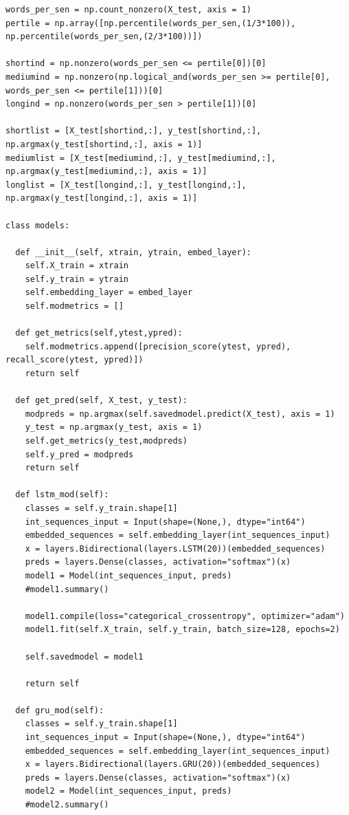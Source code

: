 \documentclass[12pt]{article}
\begin{document}
\begin{lstlisting}[breaklines]
words_per_sen = np.count_nonzero(X_test, axis = 1)
pertile = np.array([np.percentile(words_per_sen,(1/3*100)), np.percentile(words_per_sen,(2/3*100))])

shortind = np.nonzero(words_per_sen <= pertile[0])[0]
mediumind = np.nonzero(np.logical_and(words_per_sen >= pertile[0], words_per_sen <= pertile[1]))[0]
longind = np.nonzero(words_per_sen > pertile[1])[0]

shortlist = [X_test[shortind,:], y_test[shortind,:], np.argmax(y_test[shortind,:], axis = 1)]
mediumlist = [X_test[mediumind,:], y_test[mediumind,:], np.argmax(y_test[mediumind,:], axis = 1)]
longlist = [X_test[longind,:], y_test[longind,:], np.argmax(y_test[longind,:], axis = 1)]

class models:

  def __init__(self, xtrain, ytrain, embed_layer):
    self.X_train = xtrain
    self.y_train = ytrain
    self.embedding_layer = embed_layer
    self.modmetrics = []

  def get_metrics(self,ytest,ypred):
    self.modmetrics.append([precision_score(ytest, ypred), recall_score(ytest, ypred)])
    return self

  def get_pred(self, X_test, y_test):
    modpreds = np.argmax(self.savedmodel.predict(X_test), axis = 1)
    y_test = np.argmax(y_test, axis = 1)
    self.get_metrics(y_test,modpreds)
    self.y_pred = modpreds
    return self

  def lstm_mod(self):
    classes = self.y_train.shape[1]
    int_sequences_input = Input(shape=(None,), dtype="int64")
    embedded_sequences = self.embedding_layer(int_sequences_input)
    x = layers.Bidirectional(layers.LSTM(20))(embedded_sequences)
    preds = layers.Dense(classes, activation="softmax")(x)
    model1 = Model(int_sequences_input, preds)
    #model1.summary()

    model1.compile(loss="categorical_crossentropy", optimizer="adam")
    model1.fit(self.X_train, self.y_train, batch_size=128, epochs=2)
    
    self.savedmodel = model1

    return self

  def gru_mod(self):
    classes = self.y_train.shape[1]    
    int_sequences_input = Input(shape=(None,), dtype="int64")
    embedded_sequences = self.embedding_layer(int_sequences_input)
    x = layers.Bidirectional(layers.GRU(20))(embedded_sequences)
    preds = layers.Dense(classes, activation="softmax")(x)
    model2 = Model(int_sequences_input, preds)
    #model2.summary()


\end{lstlisting}
\end{document}
